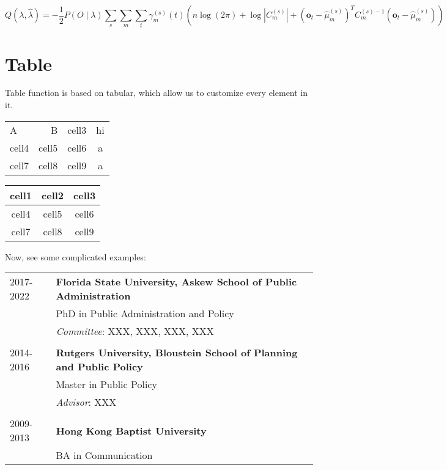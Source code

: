 \documentclass[12pt]{article}
\begin{document}
\begin{dmath}
  Q(\lambda,\hat{\lambda}) = -\frac{1}{2} P{(O \mid \lambda )} \sum_s \sum_m \sum_t \gamma_m^{(s)} (t) \left( n \log(2 \pi ) + \log \left| C_m^{(s)} \right| + \left( \mathbf{o}_t - \hat{\mu}_m^{(s)} \right) ^T C_m^{(s)-1} \left(\mathbf{o}_t - \hat{\mu}_m^{(s)}\right) \right)
\end{dmath}

\section{Table}
Table function is based on tabular, which allow us to customize every element in it. 

\begin{center}
\begin{tabular}{ l r c c}
 A & B & cell3 & hi\\
 cell4 & cell5 & cell6 & a\\  
 cell7 & cell8 & cell9  & a  
\end{tabular}
\end{center}

\begin{center}
\begin{tabular}{ |c|c|c| }
\hline
 cell1 & cell2 & cell3 \\ 
 \hline
 cell4 & cell5 & cell6 \\ 
 \hline
 cell7 & cell8 & cell9 \\
 \hline 
\end{tabular}
\end{center}

Now, see some complicated examples: 
\bigskip

\begin{tabular}{ p{3.5cm} p{10cm} }
2017-2022 & \textbf{Florida State University, Askew School of Public Administration} \\
   & PhD in Public Administration and Policy \\
   & {\it Committee}: XXX, XXX, XXX, XXX\\
   & \\
2014-2016 & \textbf{Rutgers University, Bloustein School of Planning and Public Policy} \\
   &Master in Public Policy \\
   & {\it Advisor}: XXX \\
   & \\
2009-2013 & \textbf{Hong Kong Baptist University} \\
   &BA in Communication

\end{tabular}
\end{document}
